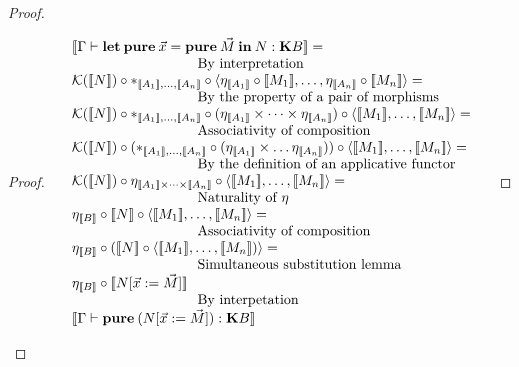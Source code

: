 \documentclass[a4paper]{article}
\begin{document}
\begin{proof}
\begin{proof}
$\begin{array}{lll}
&[\![\Gamma \vdash {\bf let \: pure \:} \vec{x} = {\bf pure \:} \vec{M} {\: \bf in \:} N : {\bf K}B]\!] = & \\
&\text{\quad\quad\quad\quad\quad\quad\quad\quad\quad By interpretation}& \\
&\mathcal{K}([\![N]\!]) \circ \ast_{[\![A_1]\!],\dots,[\![A_n]\!]} \circ \langle \eta_{[\![A_1]\!]} \circ [\![M_1]\!],\dots,\eta_{[\![A_n]\!]} \circ [\![M_n]\!] \rangle = \\
&\text{\quad\quad\quad\quad\quad\quad\quad\quad\quad By the property of a pair of morphisms}& \\
&\mathcal{K}([\![N]\!]) \circ \ast_{[\![A_1]\!],\dots,[\![A_n]\!]} \circ (\eta_{[\![A_1]\!]} \times \dots \times \eta_{[\![A_n]\!]}) \circ \langle [\![M_1]\!], \dots, [\![M_n]\!]\rangle =& \\
&\text{\quad\quad\quad\quad\quad\quad\quad\quad\quad Associativity of composition}& \\
&\mathcal{K}([\![N]\!]) \circ (\ast_{[\![A_1]\!],\dots,[\![A_n]\!]} \circ (\eta_{[\![A_1]\!]} \times \dots \eta_{[\![A_n]\!]})) \circ \langle [\![M_1]\!], \dots, [\![M_n]\!] \rangle =& \\
&\text{\quad\quad\quad\quad\quad\quad\quad\quad\quad By the definition of an applicative functor}& \\
&\mathcal{K}([\![N]\!]) \circ \eta_{[\![A_1]\!] \times \dots \times [\![A_n]\!]} \circ \langle [\![M_1]\!], \dots, [\![M_n]\!] \rangle =& \\
&\text{\quad\quad\quad\quad\quad\quad\quad\quad\quad Naturality of $\eta$}& \\
&\eta_{[\![B]\!]} \circ [\![N]\!] \circ \langle [\![M_1]\!], \dots, [\![M_n]\!] \rangle =& \\
&\text{\quad\quad\quad\quad\quad\quad\quad\quad\quad Associativity of composition}& \\
&\eta_{[\![B]\!]} \circ ([\![N]\!] \circ \langle [\![M_1]\!], \dots, [\![M_n]\!]) \rangle =& \\
&\text{\quad\quad\quad\quad\quad\quad\quad\quad\quad Simultaneous substitution lemma}& \\
&\eta_{[\![B]\!]} \circ [\![N [\vec{x} := \vec{M}]]\!]& \\
&\text{\quad\quad\quad\quad\quad\quad\quad\quad\quad By interpetation}& \\
&[\![\Gamma \vdash {\bf pure \:} (N [\vec{x} := \vec{M}]) : {\bf K}B]\!]&
\end{array}$


\end{proof}
\end{proof}
\end{document}
